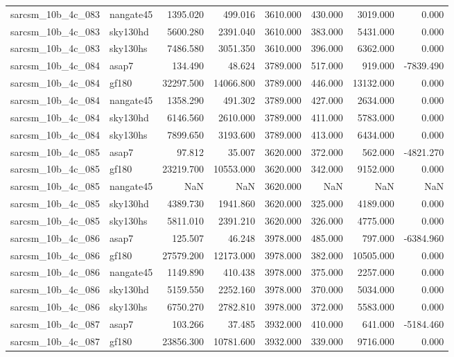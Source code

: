 \begin{tabular}{llrrrrrr}
sarcsm\_10b\_4c\_083 & nangate45 & 1395.020 & 499.016 & 3610.000 & 430.000 & 3019.000 & 0.000 \\
sarcsm\_10b\_4c\_083 & sky130hd & 5600.280 & 2391.040 & 3610.000 & 383.000 & 5431.000 & 0.000 \\
sarcsm\_10b\_4c\_083 & sky130hs & 7486.580 & 3051.350 & 3610.000 & 396.000 & 6362.000 & 0.000 \\
sarcsm\_10b\_4c\_084 & asap7 & 134.490 & 48.624 & 3789.000 & 517.000 & 919.000 & -7839.490 \\
sarcsm\_10b\_4c\_084 & gf180 & 32297.500 & 14066.800 & 3789.000 & 446.000 & 13132.000 & 0.000 \\
sarcsm\_10b\_4c\_084 & nangate45 & 1358.290 & 491.302 & 3789.000 & 427.000 & 2634.000 & 0.000 \\
sarcsm\_10b\_4c\_084 & sky130hd & 6146.560 & 2610.000 & 3789.000 & 411.000 & 5783.000 & 0.000 \\
sarcsm\_10b\_4c\_084 & sky130hs & 7899.650 & 3193.600 & 3789.000 & 413.000 & 6434.000 & 0.000 \\
sarcsm\_10b\_4c\_085 & asap7 & 97.812 & 35.007 & 3620.000 & 372.000 & 562.000 & -4821.270 \\
sarcsm\_10b\_4c\_085 & gf180 & 23219.700 & 10553.000 & 3620.000 & 342.000 & 9152.000 & 0.000 \\
sarcsm\_10b\_4c\_085 & nangate45 & NaN & NaN & 3620.000 & NaN & NaN & NaN \\
sarcsm\_10b\_4c\_085 & sky130hd & 4389.730 & 1941.860 & 3620.000 & 325.000 & 4189.000 & 0.000 \\
sarcsm\_10b\_4c\_085 & sky130hs & 5811.010 & 2391.210 & 3620.000 & 326.000 & 4775.000 & 0.000 \\
sarcsm\_10b\_4c\_086 & asap7 & 125.507 & 46.248 & 3978.000 & 485.000 & 797.000 & -6384.960 \\
sarcsm\_10b\_4c\_086 & gf180 & 27579.200 & 12173.000 & 3978.000 & 382.000 & 10505.000 & 0.000 \\
sarcsm\_10b\_4c\_086 & nangate45 & 1149.890 & 410.438 & 3978.000 & 375.000 & 2257.000 & 0.000 \\
sarcsm\_10b\_4c\_086 & sky130hd & 5159.550 & 2252.160 & 3978.000 & 370.000 & 5034.000 & 0.000 \\
sarcsm\_10b\_4c\_086 & sky130hs & 6750.270 & 2782.810 & 3978.000 & 372.000 & 5583.000 & 0.000 \\
sarcsm\_10b\_4c\_087 & asap7 & 103.266 & 37.485 & 3932.000 & 410.000 & 641.000 & -5184.460 \\
sarcsm\_10b\_4c\_087 & gf180 & 23856.300 & 10781.600 & 3932.000 & 339.000 & 9716.000 & 0.000 \\

\end{tabular}
